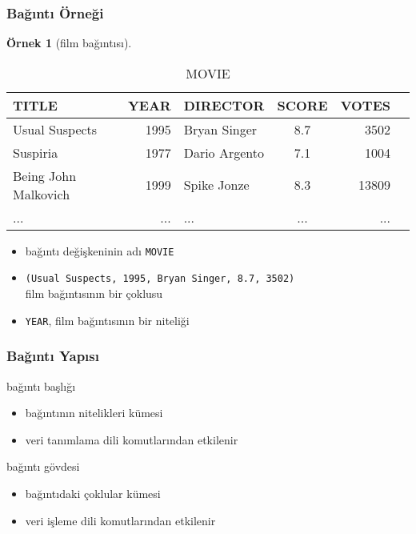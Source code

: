 \documentclass[dvipsnames]{beamer}
\theoremstyle{definition}
\theoremstyle{example}
\newtheorem{ornek}[theorem]{Örnek}
\theoremstyle{plain}
\begin{document}
\begin{frame}
  \frametitle{Bağıntı Örneği}

  \begin{ornek}[film bağıntısı]
    \begin{tiny}
    \begin{table}
      \caption{MOVIE}
      \begin{tabular}{|l|r|l|c|r|r|}\hline
TITLE                & YEAR & DIRECTOR      & SCORE & VOTES\\\hline\hline
Usual Suspects       & 1995 & Bryan Singer  &   8.7 &  3502\\\hline
Suspiria             & 1977 & Dario Argento &   7.1 &  1004\\\hline
Being John Malkovich & 1999 & Spike Jonze   &   8.3 & 13809\\\hline
...                  &  ... & ...           &   ... &   ...\\\hline
      \end{tabular}
    \end{table}
    \end{tiny}

    \pause
    \begin{itemize}
      \item bağıntı değişkeninin adı \texttt{MOVIE}
      \item \texttt{(Usual Suspects, 1995, Bryan Singer, 8.7, 3502)}\\
        film bağıntısının bir çoklusu
      \item \texttt{YEAR}, film bağıntısının bir niteliği
    \end{itemize}
  \end{ornek}
\end{frame}

\begin{frame}
  \frametitle{Bağıntı Yapısı}

  \begin{block}{bağıntı başlığı}
    \begin{itemize}
      \item bağıntının nitelikleri kümesi
      \item veri tanımlama dili komutlarından etkilenir
    \end{itemize}
  \end{block}

  \pause
  \begin{block}{bağıntı gövdesi}
    \begin{itemize}
      \item bağıntıdaki çoklular kümesi
      \item veri işleme dili komutlarından etkilenir
    \end{itemize}
  \end{block}
\end{frame}
\end{document}
